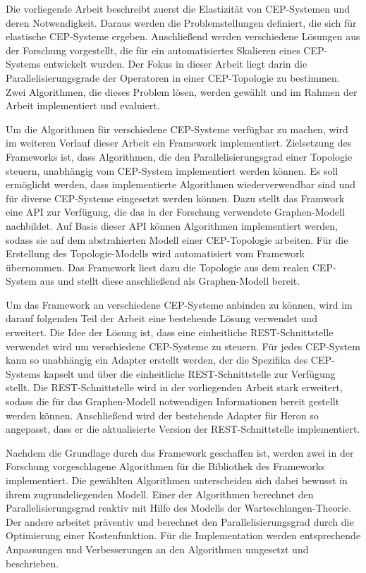 Die vorliegende Arbeit beschreibt zuerst die Elastizität von CEP-Systemen und deren Notwendigkeit.
Daraus werden die Problemstellungen definiert, die sich für elastische CEP-Systeme ergeben.
Anschließend werden verschiedene Lösungen aus der Forschung vorgestellt, die für ein automatisiertes Skalieren eines CEP-Systems entwickelt wurden.
Der Fokus in dieser Arbeit liegt darin die Parallelisierungsgrade der Operatoren in einer CEP-Topologie zu bestimmen.
Zwei Algorithmen, die dieses Problem lösen, werden gewählt und im Rahmen der Arbeit implementiert und evaluiert.

Um die Algorithmen für verschiedene CEP-Systeme verfügbar zu machen, wird im weiteren Verlauf dieser Arbeit ein Framework implementiert.
Zielsetzung des Frameworks ist, dass Algorithmen, die den Parallelisierungsgrad einer Topologie steuern, unabhängig vom CEP-System implementiert werden können.
Es soll ermöglicht werden, dass implementierte Algorithmen wiederverwendbar sind und für diverse CEP-Systeme eingesetzt werden können.
Dazu stellt das Framwork eine API zur Verfügung, die das in der Forschung verwendete Graphen-Modell nachbildet.
Auf Basis dieser API können Algorithmen implementiert werden, sodass sie auf dem abstrahierten Modell einer CEP-Topologie arbeiten.
Für die Erstellung des Topologie-Modells wird automatisiert vom Framework übernommen.
Das Framework liest dazu die Topologie aus dem realen CEP-System aus und stellt diese anschließend als Graphen-Modell bereit. 

Um das Framework an verschiedene CEP-Systeme anbinden zu können, wird im darauf folgenden Teil der Arbeit eine bestehende Lösung \cite{goggel_vergleich_2018} verwendet und erweitert.
Die Idee der Lösung ist, dass eine einheitliche REST-Schnittstelle verwendet wird um verschiedene CEP-Systeme zu steuern.
Für jedes CEP-System kann so unabhängig ein Adapter erstellt werden, der die Spezifika des CEP-Systems kapselt und über die einheitliche REST-Schnittstelle zur Verfügung stellt.
Die REST-Schnittstelle wird in der vorliegenden Arbeit stark erweitert, sodass die für das Graphen-Modell notwendigen Informationen bereit gestellt werden können.
Anschließend wird der bestehende Adapter für Heron so angepasst, dass er die aktualisierte Version der REST-Schnittstelle implementiert.

Nachdem die Grundlage durch das Framework geschaffen ist, werden zwei in der Forschung vorgeschlagene Algorithmen für die Bibliothek des Frameworks implementiert.
Die gewählten Algorithmen unterscheiden sich dabei bewusst in ihrem zugrundeliegenden Modell.
Einer der Algorithmen berechnet den Parallelisierungsgrad reaktiv mit Hilfe des Modells der Warteschlangen-Theorie.
Der andere arbeitet präventiv und berechnet den Parallelisierungsgrad durch die Optimierung einer Kostenfunktion.
Für die Implementation werden entsprechende Anpassungen und Verbesserungen an den Algorithmen umgesetzt und beschrieben.

